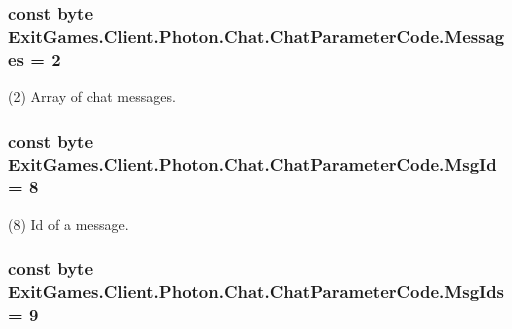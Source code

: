 \subsubsection[{\texorpdfstring{Messages}{Messages}}]{\setlength{\rightskip}{0pt plus 5cm}const byte Exit\+Games.\+Client.\+Photon.\+Chat.\+Chat\+Parameter\+Code.\+Messages = 2}\hypertarget{class_exit_games_1_1_client_1_1_photon_1_1_chat_1_1_chat_parameter_code_a3125fb72f9cff51b552d77abd26bdcfe}{}\label{class_exit_games_1_1_client_1_1_photon_1_1_chat_1_1_chat_parameter_code_a3125fb72f9cff51b552d77abd26bdcfe}


(2) Array of chat messages.

\subsubsection[{\texorpdfstring{Msg\+Id}{MsgId}}]{\setlength{\rightskip}{0pt plus 5cm}const byte Exit\+Games.\+Client.\+Photon.\+Chat.\+Chat\+Parameter\+Code.\+Msg\+Id = 8}\hypertarget{class_exit_games_1_1_client_1_1_photon_1_1_chat_1_1_chat_parameter_code_a0a54ebe20f51af2268716891be3d6570}{}\label{class_exit_games_1_1_client_1_1_photon_1_1_chat_1_1_chat_parameter_code_a0a54ebe20f51af2268716891be3d6570}


(8) Id of a message.

\subsubsection[{\texorpdfstring{Msg\+Ids}{MsgIds}}]{\setlength{\rightskip}{0pt plus 5cm}const byte Exit\+Games.\+Client.\+Photon.\+Chat.\+Chat\+Parameter\+Code.\+Msg\+Ids = 9}\hypertarget{class_exit_games_1_1_client_1_1_photon_1_1_chat_1_1_chat_parameter_code_abc7e73d686ae0713e349611c6ddd7a8e}{}\label{class_exit_games_1_1_client_1_1_photon_1_1_chat_1_1_chat_parameter_code_abc7e73d686ae0713e349611c6ddd7a8e}


